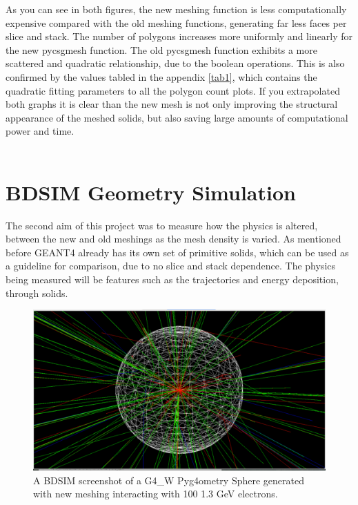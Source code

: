 \documentclass[12pt,a4paper]{article}
\begin{document}
\newpage
\noindent As you can see in both figures, the new meshing function is less computationally expensive compared with the old meshing functions, generating far less faces per slice and stack. The number of polygons increases more uniformly and linearly for the new pycsgmesh function. The old pycsgmesh function exhibits a more scattered and quadratic relationship, due to the boolean operations. This is also confirmed by the values tabled in the appendix \ref{tab1}, which contains the quadratic fitting parameters to all the polygon count plots. If you extrapolated both graphs it is clear than the new mesh is not only improving the structural appearance of the meshed solids, but also saving large amounts of computational power and time.
\\\label{recur}\\


\section{BDSIM Geometry Simulation}
\label{int}
The second aim of this project was to measure how the physics is altered, between the new and old meshings as the mesh density is varied. As mentioned before GEANT4 already has its own set of primitive solids, which can be used as a guideline for comparison, due to no slice and stack dependence. The physics being measured will be features such as the trajectories and energy deposition, through solids.

\begin{figure}[h!]
\centering
\includegraphics[scale=0.33]{Images//BDSIM//titanium.pdf}
\caption[width=\columnwidth]{A BDSIM screenshot of a G4\_W Pyg4ometry Sphere generated with new meshing interacting with 100 1.3 GeV electrons.}
\label{black}
\end{figure}
\end{document}
